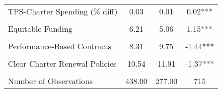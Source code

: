 \begin{table}[!h]
\begin{tabular}[t]{lccc}
TPS-Charter Spending (\% diff) & 0.03 & 0.01 & 0.02***\\
\cellcolor{gray!10}{Total Spending (per-pupil)} & \cellcolor{gray!10}{11480.57} & \cellcolor{gray!10}{9178.68} & \cellcolor{gray!10}{2301.89***}\\
Equitable Funding & 6.21 & 5.06 & 1.15***\\
\cellcolor{gray!10}{No Caps on CS Growth} & \cellcolor{gray!10}{8.26} & \cellcolor{gray!10}{9.12} & \cellcolor{gray!10}{-0.86***}\\
Performance-Based Contracts & 8.31 & 9.75 & -1.44***\\
\cellcolor{gray!10}{Transparent Charter Startup Policies} & \cellcolor{gray!10}{7.98} & \cellcolor{gray!10}{10.16} & \cellcolor{gray!10}{-2.18***}\\
Clear Charter Renewal Policies & 10.54 & 11.91 & -1.37***\\
\cellcolor{gray!10}{Exempt from State/District Regs} & \cellcolor{gray!10}{7.51} & \cellcolor{gray!10}{8.04} & \cellcolor{gray!10}{-0.53***}\\
\midrule
Number of Observations & 438.00 & 277.00 & 715\\
\bottomrule
\end{tabular}
\end{table}
